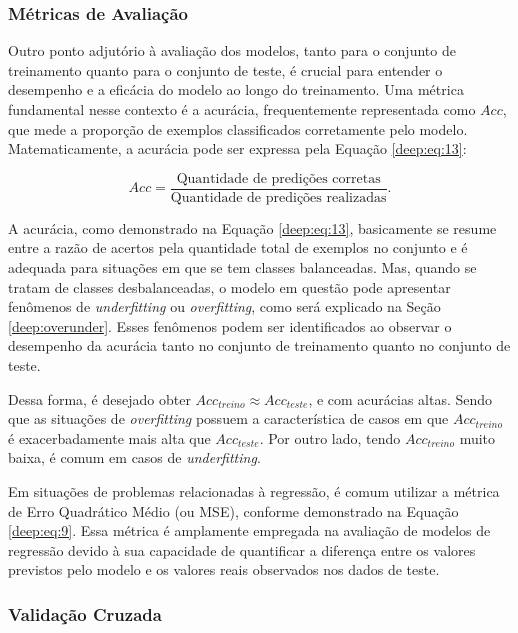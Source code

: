 \subsubsection{Métricas de Avaliação}
\label{deep:metrics}

Outro ponto adjutório à avaliação dos modelos, tanto para o conjunto de treinamento quanto para o conjunto de teste, é crucial para entender o desempenho e a eficácia do modelo ao longo do treinamento.  Uma métrica fundamental nesse contexto é a acurácia, frequentemente representada como $Acc$, que mede a proporção de exemplos classificados corretamente pelo modelo. Matematicamente, a acurácia pode ser expressa pela Equação \ref{deep:eq:13}:

\begin{equation}
    \label{deep:eq:13}
    Acc = \frac{\text{Quantidade de predições corretas}}{\text{Quantidade de predições realizadas}}.
\end{equation}

A acurácia, como demonstrado na Equação \ref{deep:eq:13}, basicamente se resume entre a razão de acertos pela quantidade total de exemplos no conjunto e é adequada para situações em que se tem classes balanceadas. Mas, quando se tratam de classes desbalanceadas, o modelo em questão pode apresentar fenômenos de \textit{underfitting} ou \textit{overfitting}, como será explicado na Seção \ref{deep:overunder}. Esses fenômenos podem ser identificados ao observar o desempenho da acurácia tanto no conjunto de treinamento quanto no conjunto de teste.

Dessa forma, é desejado obter $Acc_{treino} \approx Acc_{teste}$, e com  acurácias altas. Sendo que as situações de \textit{overfitting} possuem a característica de casos em que $Acc_{treino}$ é exacerbadamente mais alta que $Acc_{teste}$. Por outro lado, tendo $Acc_{treino}$ muito baixa, é comum em casos de \textit{underfitting}.

Em situações de problemas relacionadas à regressão, é comum utilizar a métrica de Erro Quadrático Médio (ou MSE), conforme demonstrado na Equação \ref{deep:eq:9}. Essa métrica é amplamente empregada na avaliação de modelos de regressão devido à sua capacidade de quantificar a diferença entre os valores previstos pelo modelo e os valores reais observados nos dados de teste.

\subsubsection{Validação Cruzada}
\label{deep:cross}

